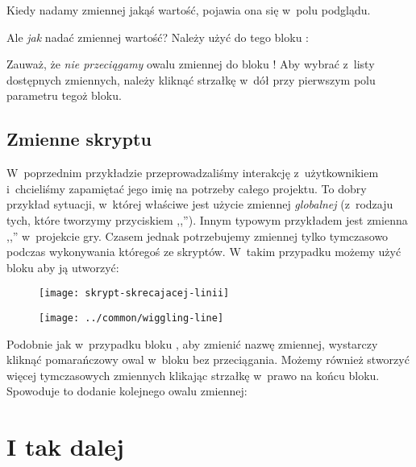 \documentclass[a4paper]{report}
\begin{document}

Kiedy nadamy zmiennej jakąś wartość, pojawia ona się w~polu podglądu.

Ale \emph{jak} nadać zmiennej wartość? Należy użyć do tego bloku :\nopagebreak


Zauważ, że \emph{nie przeciągamy} owalu zmiennej do bloku ! Aby wybrać z~listy dostępnych zmiennych, należy kliknąć strzałkę w~dół przy pierwszym polu parametru tegoż bloku.

\subsection{Zmienne skryptu}

W~poprzednim przykładzie przeprowadzaliśmy interakcję z~użytkownikiem i~chcieliśmy zapamiętać jego imię na potrzeby całego projektu. To dobry przykład sytuacji, w~której właściwe jest użycie zmiennej \emph{globalnej} (z~rodzaju tych, które tworzymy przyciskiem ,,''). Innym typowym przykładem jest zmienna ,,'' w~projekcie gry. Czasem jednak potrzebujemy zmiennej tylko tymczasowo podczas wykonywania któregoś ze skryptów. W~takim przypadku możemy użyć bloku  aby ją utworzyć:\nopagebreak

\begin{figure}[H]
\begin{minipage}{0.5\textwidth}
\centering
\texttt{[image: skrypt-skrecajacej-linii]}%
\end{minipage}%
\begin{minipage}{0.5\textwidth}
\centering
\texttt{[image: ../common/wiggling-line]}
\end{minipage}%
\end{figure}

Podobnie jak w~przypadku bloku , aby zmienić nazwę zmiennej, wystarczy kliknąć pomarańczowy owal w~bloku  bez przeciągania. Możemy również stworzyć więcej tymczasowych zmiennych klikając strzałkę w~prawo na końcu bloku. Spowoduje to dodanie kolejnego owalu zmiennej:\nopagebreak


\section{I tak dalej}
\end{document}
